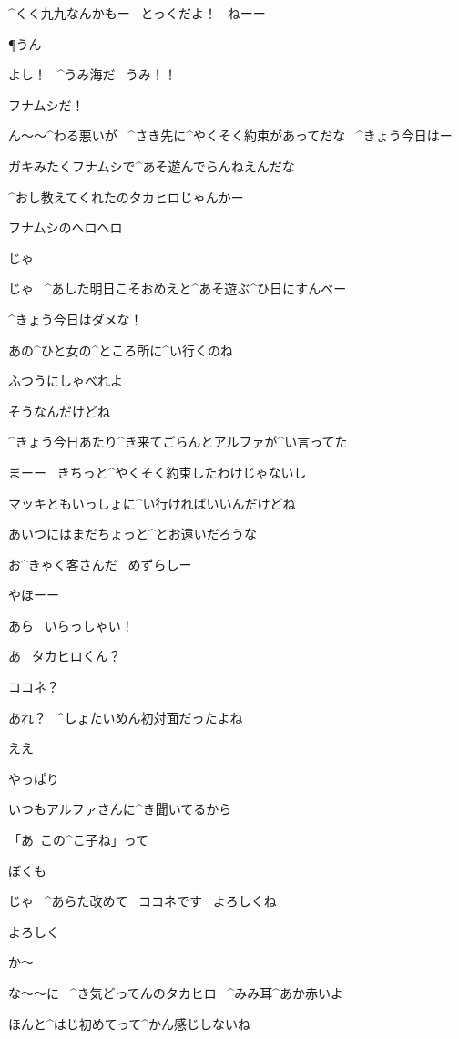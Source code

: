 \M ^{くく}{九九}なんかもー
\ とっくだよ！
\ ねーー

\P うん

\page
\M よし！
\ ^{うみ}{海}だ
\ うみ！！

\M フナムシだ！

\T ん〜〜^{わる}{悪}いが
\ ^{さき}{先}に^{やくそく}{約束}があってだな
\ ^{きょう}{今日}はー

\T ガキみたくフナムシで^{あそ}{遊}んでらんねえんだな

\M ^{おし}{教}えてくれたのタカヒロじゃんかー

\M フナムシのヘロヘロ

\page
\T じゃ

\T じゃ
\ ^{あした}{明日}こそおめえと^{あそ}{遊}ぶ^{ひ}{日}にすんべー

\T ^{きょう}{今日}はダメな！

\M あの^{ひと}{女}の^{ところ}{所}に^{い}{行}くのね

\T ふつうにしゃべれよ

\T そうなんだけどね

\page
\T ^{きょう}{今日}あたり^{き}{来}てごらんとアルファが^{い}{言}ってた

\T まーー
\ きちっと^{やくそく}{約束}したわけじゃないし

\T マッキともいっしょに^{い}{行}ければいいんだけどね

\T あいつにはまだちょっと^{とお}{遠}いだろうな

\page
\T お^{きゃく}{客}さんだ
\ めずらしー

\T やほーー

\page
\A あら
\ いらっしゃい！

\K あ
\ タカヒロくん？

\page
\T ココネ？

\A あれ？
\ ^{しょたいめん}{初対面}だったよね

\K ええ

\K やっぱり

\K いつもアルファさんに^{き}{聞}いてるから

\K 「あ\ この^{こ}{子}ね」って

\T ぼくも

\page
\K じゃ
\ ^{あらた}{改}めて
\ ココネです
\ よろしくね

\T よろしく

\A か〜

\A な〜〜に
\ ^{き}{気}どってんのタカヒロ
\ ^{みみ}{耳}^{あか}{赤}いよ

\page
\K ほんと^{はじ}{初}めてって^{かん}{感}じしないね

